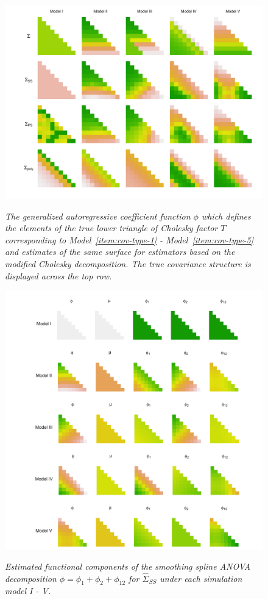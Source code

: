 \begin{figure}[H] 
\centering
\caption{\textit{The generalized autoregressive coefficient function $\phi$ which defines the elements of the true lower triangle of Cholesky factor $T$ corresponding to Model~\ref{item:cov-type-1} - Model~\ref{item:cov-type-5} and estimates of the same surface for estimators based on the modified Cholesky decomposition. The true covariance structure is displayed across the top row.}}
  \includegraphics[width = 1\textwidth]{img/chapter-4/cholesky-estimate-lattice}
  \label{fig:chol-estimate-lattice}
\end{figure}

%

\begin{figure}[H] 
\caption{\textit{Estimated functional components of the smoothing spline ANOVA decomposition $\phi = \phi_1 + \phi_2 + \phi_{12}$ for $\hat{\Sigma}_{SS}$ under each simulation model I - V.}}
  \includegraphics[width = \textwidth]{img/chapter-4/ssanova-estimate-lattice} \label{fig:ssanova-component-lattice}
\end{figure}


